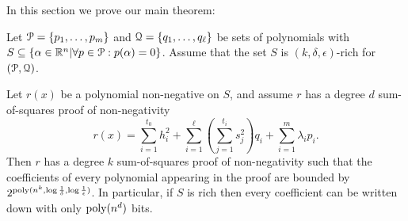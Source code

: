 \documentclass[a4paper,UKenglish]{lipics-v2016}
\begin{document}
In this section we prove our main theorem:

\begin{theorem}\label{thm:main}
Let $\mathcal P = \{p_1,\dots,p_m\}$ and $\mathcal Q = \{q_1, \dots, q_\ell\}$ be sets of polynomials with $S \subseteq \{\alpha \in \mathbb R^n | \forall p \in \mathcal P: p(\alpha) = 0\}$. Assume that the set $S$ is $(k,\delta,\epsilon)$-rich for $(\mathcal P,\mathcal Q)$.

Let $r(x)$ be a polynomial non-negative on $S$, and assume $r$ has a degree $d$ sum-of-squares proof of non-negativity 
\[r(x) = \sum_{i=1}^{t_0} h_i^2 + \sum_{i=1}^\ell \left(\sum_{j=1}^{t_i} s_j^2\right) q_i + \sum_{i=1}^m \lambda_i p_i.\] 
Then $r$ has a degree $k$ sum-of-squares proof of non-negativity such that the coefficients of every polynomial appearing in the proof are bounded by $2^{\operatorname{poly}(n^k,\log \frac{1}{\delta},\log \frac{1}{\epsilon})}$. In particular, if $S$ is rich then every coefficient can be written down with only $\operatorname{poly}(n^d)$ bits. 
\end{theorem}
\end{document}
